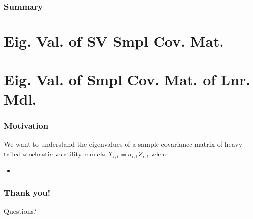 \documentclass{beamer}
\begin{document}
\begin{frame}
  \frametitle{Summary}
  
\end{frame}

\section{Eig. Val. of SV Smpl Cov. Mat.}

\section{Eig. Val. of Smpl Cov. Mat. of Lnr. Mdl.}

\begin{frame}
  \frametitle{Motivation}
  We want to understand the eigenvalues of a sample covariance matrix
  of heavy-tailed stochastic volatility models
  $X_{i, t} = \sigma_{i, t} Z_{i,t}$ where
  \begin{itemize}
  \item 
  \end{itemize}
  
\end{frame}
\begin{frame}
   \frametitle{Thank you!}
   Questions?
 \end{frame}


\end{document}
